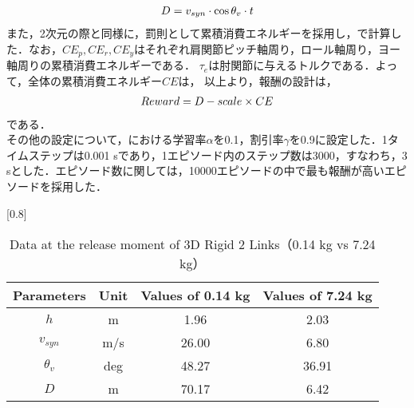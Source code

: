 \begin{small}
\begin{eqnarray}
  \equlabel{14}
  D = v_{syn} \cdot \cos\theta_{v} \cdot t
\end{eqnarray}
また，2次元の際と同様に，罰則として累積消費エネルギーを採用し，で計算した．なお，$CE_{p},CE_{r},CE_{y}$はそれぞれ肩関節ピッチ軸周り，ロール軸周り，ヨー軸周りの累積消費エネルギーである．
$\tau_{e}$は肘関節に与えるトルクである．よって，全体の累積消費エネルギー$CE$は，
以上より，報酬の設計は，
\begin{eqnarray}
  \equlabel{15}
  Reward = D - scale \times CE
\end{eqnarray}
である．\\
その他の設定について，における学習率$\alpha$を0.1，割引率$\gamma$を0.9に設定した．1タイムステップは0.001 sであり，1エピソード内のステップ数は3000，すなわち，3 sとした．エピソード数に関しては，10000エピソードの中で最も報酬が高いエピソードを採用した．
\begin{table}[t]
  \begin{center}
    \caption{Data at the release moment of 3D Rigid 2 Links（0.14 kg vs 7.24 kg）}
    \scalebox{0.8}[0.8]{
    \begin{tabular}{c|c|c|c}
      \hline
      Parameters & Unit & Values of 0.14 kg & Values of 7.24 kg \\
      \hline
      $h$ & m & 1.96 & 2.03 \\
      $v_{syn}$ & m/s & 26.00 & 6.80 \\
      $\theta_{v}$ & deg & 48.27 & 36.91 \\
      $D$ & m & 70.17 & 6.42 \\
      \hline
    \end{tabular}
    }
  \end{center}
\end{table}

\end{small}
